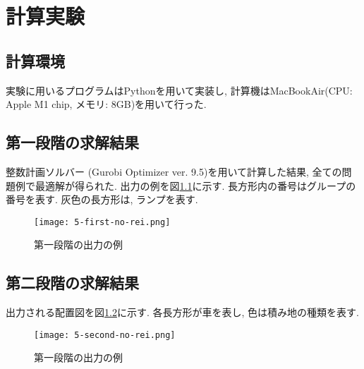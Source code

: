 \chapter{計算実験}\label{computational_result}
\section{計算環境}
実験に用いるプログラムはPythonを用いて実装し, 計算機はMacBookAir(CPU: Apple M1 chip, メモリ: 8GB)を用いて行った. 

\section{第一段階の求解結果}
整数計画ソルバー (Gurobi Optimizer ver. 9.5)を用いて計算した結果, 全ての問題例で最適解が得られた. 
出力の例を図\ref{first-no-rei}に示す. 
長方形内の番号はグループの番号を表す. 
灰色の長方形は, ランプを表す. \\

\begin{figure}[b]
    \texttt{[image: 5-first-no-rei.png]}
    \caption{第一段階の出力の例}
    \label{first-no-rei}
\end{figure}
\clearpage

\section{第二段階の求解結果}
出力される配置図を図\ref{second-no-rei}に示す. 
各長方形が車を表し, 色は積み地の種類を表す. \\

\begin{figure}[b]
    \texttt{[image: 5-second-no-rei.png]}
    \caption{第一段階の出力の例}
    \label{second-no-rei}
\end{figure}

